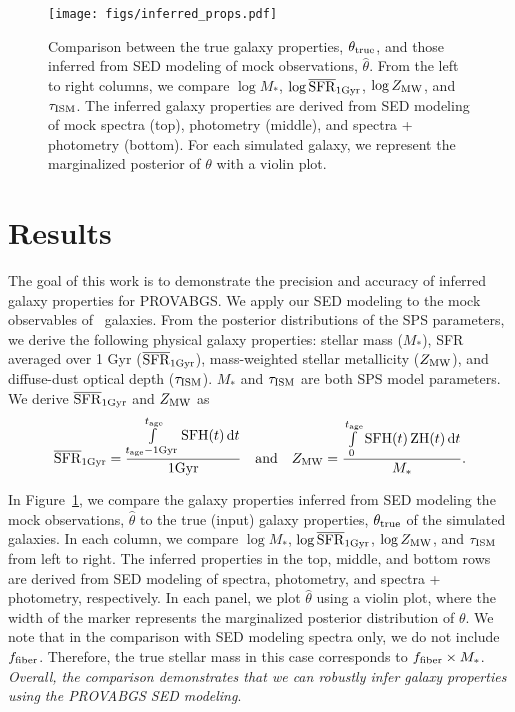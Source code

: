 \begin{figure}
\begin{center}
\texttt{[image: figs/inferred\_props.pdf]}
\caption{
    \label{fig:prop_inf}
    Comparison between the true galaxy properties, $\theta_{\rm true}$, and
    those inferred from SED modeling of mock observations, $\hat{\theta}$. 
    From the left to right columns, we compare $\log M_*$, $\log \overline{\rm SFR}_{\rm 1Gyr}$, 
    $\log Z_{\rm MW}$, and $\tau_{\rm ISM}$. 
    The inferred galaxy properties are derived from SED modeling of mock
    spectra (top), photometry (middle), and spectra + photometry (bottom). 
    For each simulated galaxy, we represent the marginalized posterior of
    $\theta$ with a violin plot.  %
}
\end{center}
\end{figure}

\section{Results} \label{sec:results}
The goal of this work is to demonstrate the precision and accuracy of inferred
galaxy properties for PROVABGS. 
We apply our SED modeling to the mock observables of  \lgal~galaxies.
From the posterior distributions of the SPS parameters, we derive the following
physical galaxy properties: stellar mass ($M_*$), SFR averaged over 1 Gyr
($\overline{\rm SFR}_{\rm 1Gyr}$), mass-weighted stellar metallicity ($Z_{\rm MW}$), and diffuse-dust
optical depth ($\tau_{\rm ISM}$).
$M_*$ and $\tau_{\rm ISM}$ are both SPS model parameters. 
We derive $\overline{\rm SFR}_{\rm 1Gyr}$ and $Z_{\rm MW}$ as 
\begin{equation}
    \avgsfr = \frac{\int\limits_{t_{\rm age} - {\rm 1 Gyr}}^{t_{\rm age}}{\rm
    SFH}(t)\,{\rm d}t}{{\rm 1 Gyr}} \quad{\rm and}\quad
    Z_{\rm MW} = \frac{\int\limits_0^{t_{\rm age}}{\rm SFH}(t)\,{\rm
    ZH}(t)\,{\rm d}t}{M_*}.
\end{equation} 

In Figure~\ref{fig:prop_inf}, we compare the galaxy properties inferred from
SED modeling the mock observations, $\hat{\theta}$ to the true (input) galaxy
properties, $\theta_{\rm true}$ of the simulated galaxies.
In each column, we compare $\log M_*$, $\log \overline{\rm SFR}_{\rm 1Gyr}$, $\log Z_{\rm MW}$, and
$\tau_{\rm ISM}$ from left to right. 
The inferred properties in the top, middle, and bottom rows are derived from
SED modeling of spectra, photometry, and spectra + photometry, respectively.
In each panel, we plot $\hat{\theta}$ using a violin plot, where the width
of the marker represents the marginalized posterior distribution of $\theta$. 
We note that in the comparison with SED modeling spectra only, we do not
include $f_{\rm fiber}$. 
Therefore, the true stellar mass in this case corresponds to $f_{\rm fiber}
\times M_*$. 
\emph{Overall, the comparison demonstrates that we can robustly infer galaxy
properties using the {\sc PROVABGS} SED modeling}. 


